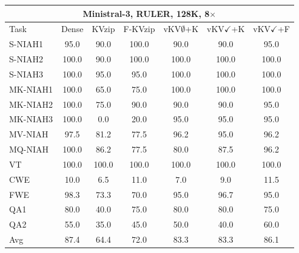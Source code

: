 \begin{tabular}{lcccccc}
\toprule
\multicolumn{7}{c}{Ministral-3, RULER, 128K, 8$\times$} \\
\midrule
Task & Dense & KVzip & F-KVzip & vKV$\emptyset$+K & vKV$\checkmark$+K & vKV$\checkmark$+F \\
\midrule
S-NIAH1 & 95.0 & 90.0 & 100.0 & 90.0 & 90.0 & 95.0 \\
S-NIAH2 & 100.0 & 90.0 & 100.0 & 100.0 & 100.0 & 100.0 \\
S-NIAH3 & 100.0 & 95.0 & 95.0 & 100.0 & 100.0 & 100.0 \\
MK-NIAH1 & 100.0 & 65.0 & 75.0 & 100.0 & 100.0 & 100.0 \\
MK-NIAH2 & 100.0 & 75.0 & 90.0 & 90.0 & 90.0 & 95.0 \\
MK-NIAH3 & 100.0 & 0.0 & 20.0 & 95.0 & 95.0 & 95.0 \\
MV-NIAH & 97.5 & 81.2 & 77.5 & 96.2 & 95.0 & 96.2 \\
MQ-NIAH & 100.0 & 86.2 & 77.5 & 80.0 & 87.5 & 96.2 \\
VT & 100.0 & 100.0 & 100.0 & 100.0 & 100.0 & 100.0 \\
CWE & 10.0 & 6.5 & 11.0 & 7.0 & 9.0 & 11.5 \\
FWE & 98.3 & 73.3 & 70.0 & 95.0 & 96.7 & 95.0 \\
QA1 & 80.0 & 40.0 & 75.0 & 80.0 & 80.0 & 75.0 \\
QA2 & 55.0 & 35.0 & 45.0 & 50.0 & 40.0 & 60.0 \\
\midrule
Avg & 87.4 & 64.4 & 72.0 & 83.3 & 83.3 & 86.1 \\
\bottomrule
\end{tabular}
\vspace{0.8em}

